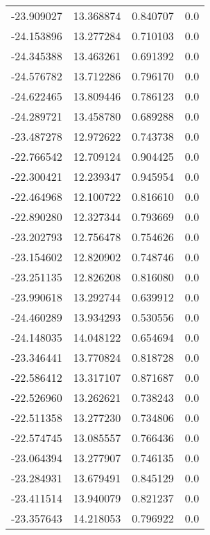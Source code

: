 \begin{tabular}{rrrr}
      -23.909027 &        13.368874 &    0.840707 &   0.0 \\
      -24.153896 &        13.277284 &    0.710103 &   0.0 \\
      -24.345388 &        13.463261 &    0.691392 &   0.0 \\
      -24.576782 &        13.712286 &    0.796170 &   0.0 \\
      -24.622465 &        13.809446 &    0.786123 &   0.0 \\
      -24.289721 &        13.458780 &    0.689288 &   0.0 \\
      -23.487278 &        12.972622 &    0.743738 &   0.0 \\
      -22.766542 &        12.709124 &    0.904425 &   0.0 \\
      -22.300421 &        12.239347 &    0.945954 &   0.0 \\
      -22.464968 &        12.100722 &    0.816610 &   0.0 \\
      -22.890280 &        12.327344 &    0.793669 &   0.0 \\
      -23.202793 &        12.756478 &    0.754626 &   0.0 \\
      -23.154602 &        12.820902 &    0.748746 &   0.0 \\
      -23.251135 &        12.826208 &    0.816080 &   0.0 \\
      -23.990618 &        13.292744 &    0.639912 &   0.0 \\
      -24.460289 &        13.934293 &    0.530556 &   0.0 \\
      -24.148035 &        14.048122 &    0.654694 &   0.0 \\
      -23.346441 &        13.770824 &    0.818728 &   0.0 \\
      -22.586412 &        13.317107 &    0.871687 &   0.0 \\
      -22.526960 &        13.262621 &    0.738243 &   0.0 \\
      -22.511358 &        13.277230 &    0.734806 &   0.0 \\
      -22.574745 &        13.085557 &    0.766436 &   0.0 \\
      -23.064394 &        13.277907 &    0.746135 &   0.0 \\
      -23.284931 &        13.679491 &    0.845129 &   0.0 \\
      -23.411514 &        13.940079 &    0.821237 &   0.0 \\
      -23.357643 &        14.218053 &    0.796922 &   0.0 \\

\end{tabular}

